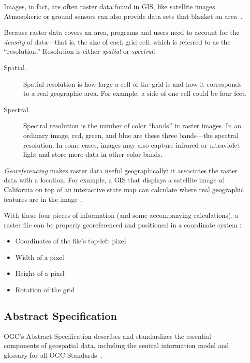 Images, in fact, are often raster data found in GIS, like satellite images. Atmospheric or ground sensors can also provide data sets that blanket an area~\cite{gentle_intro}.

Because raster data covers an area, programs and users need to account for the \textit{density} of data---that is, the size of each grid cell, which is referred to as the ``resolution.'' Resolution is either \textit{spatial} or \textit{spectral}:

\begin{description}
  \item[Spatial.] Spatial resolution is how large a cell of the grid is and how it corresponds to a real geographic area. For example, a side of one cell could be four feet.
  \item[Spectral.] Spectral resolution is the number of color ``bands'' in raster images. In an ordinary image, red, green, and blue are these three bands---the spectral resolution. In some cases, images may also capture infrared or ultraviolet light and store more data in other color bands.
\end{description}

\textit{Georeferencing} makes raster data useful geographically: it associates the raster data with a location. For example, a GIS that displays a satellite image of California on top of an interactive state map can calculate where real geographic features are in the image~\cite{gentle_intro}.

With these four pieces of information (and some accompanying calculations), a raster file can be properly georeferenced and positioned in a coordinate system \cite{gentle_intro}:

\begin{itemize}
  \item Coordinates of the file's top-left pixel
  \item Width of a pixel
  \item Height of a pixel
  \item Rotation of the grid
\end{itemize}

\subsection{Abstract Specification}
OGC's Abstract Specification describes and standardizes the essential components of geospatial data, including the central information model and glossary for all OGC Standards~\cite{AbstractSpecFaq}.

